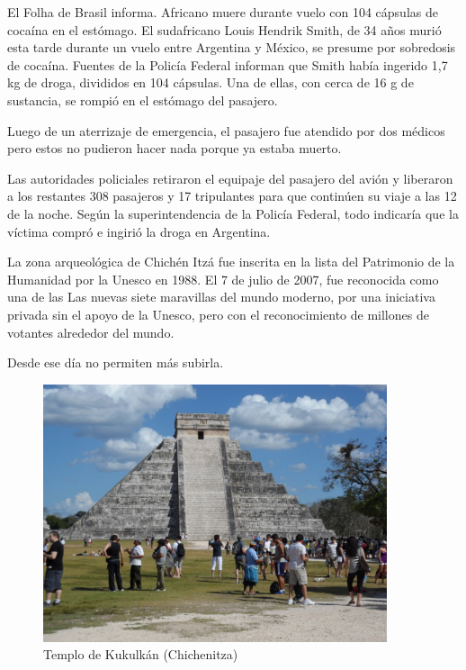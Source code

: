 \documentclass[12pt,twoside,openright,a5paper]{book}
\begin{document}
\vspace{0.5cm}
\hrulefill\hspace{0.2cm} \decofourleft\decofourright \hspace{0.2cm} \hrulefill
\vspace{0.5cm}

El Folha de Brasil informa. Africano muere
durante vuelo con 104 cápsulas de cocaína en el estómago.  El sudafricano
Louis Hendrik Smith, de 34 años murió esta tarde durante un vuelo entre
Argentina y México, se presume por sobredosis de cocaína. Fuentes de
la Policía Federal informan que Smith había ingerido 1,7 kg de droga,
divididos en 104 cápsulas. Una de ellas, con cerca de 16 g de sustancia,
se rompió en el estómago del pasajero.

Luego de un aterrizaje de emergencia, el pasajero fue atendido por dos
médicos pero estos no pudieron hacer nada porque ya estaba muerto.

Las autoridades policiales retiraron el equipaje del pasajero del avión y
liberaron a los restantes 308 pasajeros y 17 tripulantes para que continúen
su viaje a las 12 de la noche.  Según la superintendencia de la Policía
Federal, todo indicaría que la víctima compró e ingirió la droga en
Argentina.


\vspace{0.5cm}
\hrulefill\hspace{0.2cm} \decofourleft\decofourright \hspace{0.2cm} \hrulefill
\vspace{0.5cm}

La zona arqueológica de Chichén Itzá fue inscrita en la lista del
Patrimonio de la Humanidad por la Unesco en 1988. El 7 de julio de 2007, fue
reconocida como una de las Las nuevas siete maravillas del mundo moderno, por
una iniciativa privada sin el apoyo de la Unesco, pero con el reconocimiento
de millones de votantes alrededor del mundo.

Desde ese día no permiten más subirla.

\begin{figure}[H]
  \centering
    \includegraphics[width=0.9\textwidth]{fotos/2012/chichen}
  \caption{Templo de Kukulkán (Chichenitza)}
  \label{Templo de Kukulkán (Chichenitza)}
\end{figure}
\end{document}
